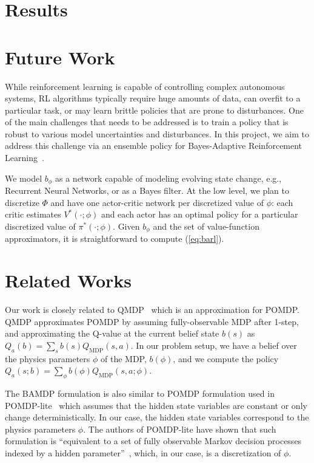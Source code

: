 \documentclass{article}
\begin{document}
\section{Results}

\section{Future Work}





While reinforcement learning is capable of controlling complex autonomous systems, RL algorithms typically require huge amounts of data, can overfit to a particular task, or may learn brittle policies that are prone to disturbances. One of the main challenges that needs to be addressed is to train a policy that is robust to various model uncertainties and disturbances. In this project, we aim to address this challenge via an ensemble policy for Bayes-Adaptive Reinforcement Learning~\cite{ghavamzadeh2015bayesian}.

We model $b_\phi$ as a network capable of modeling evolving state change, e.g., Recurrent Neural Networks, or as a Bayes filter. At the low level, we plan to discretize $\Phi$ and have one actor-critic network per discretized value of $\phi$: each critic estimates $V^*(\cdot;\phi)$ and each actor has an optimal policy for a particular discretized value of $\pi^*(\cdot;\phi)$. Given $b_\phi$ and the set of value-function approximators, it is straightforward to compute (\ref{eq:barl}).

\section{Related Works}
Our work is closely related to QMDP~\cite{littman1995learning, karkus2017qmdp} which is an approximation for POMDP. QMDP approximates POMDP by assuming fully-observable MDP after 1-step, and approximating the Q-value at the current belief state $b(s)$ as $Q_a(b) =\sum_s b(s)Q_{\text{MDP}}(s, a)$. In our problem setup, we have a belief over the physics parameters $\phi$ of the MDP, $b(\phi)$, and we compute the policy $Q_a(s;b) = \sum_\phi b(\phi)Q_{\text{MDP}}(s,a;\phi)$.

The BAMDP formulation is also similar to POMDP formulation used in POMDP-lite~\cite{chen2016pomdp} which assumes that the hidden state variables are constant or only change deterministically. In our case, the hidden state variables correspond to the physics parameters $\phi$. The authors of POMDP-lite have shown that such formulation is ``equivalent to a set of fully observable Markov decision processes indexed by a hidden parameter''~\cite{chen2016pomdp}, which, in our case, is a discretization of $\phi$.
\end{document}
